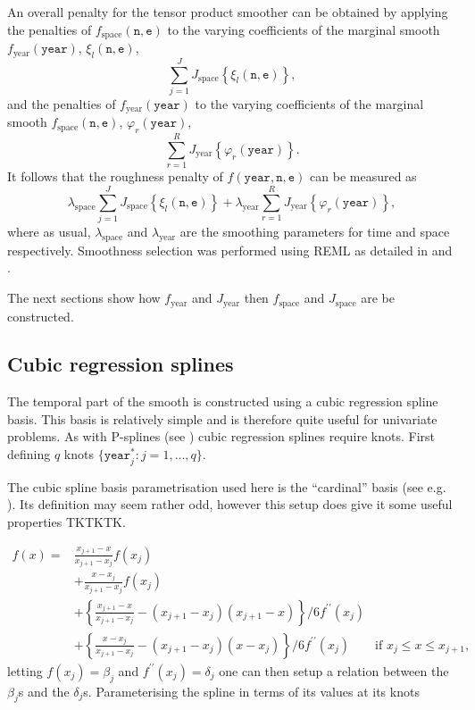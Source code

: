 An overall penalty for the tensor product smoother can be obtained by applying the penalties of $f_\text{space}(\texttt{n},\texttt{e})$ to the varying coefficients of the marginal smooth $f_\text{year}(\texttt{year})$, $\xi_l(\texttt{n},\texttt{e})$,
$$
\sum_{j=1}^J J_\text{space}\left\{  \xi_l(\texttt{n},\texttt{e}) \right\},
$$ 
and the penalties of $f_\text{year}(\texttt{year})$ to the varying coefficients of the marginal smooth $f_\text{space}(\texttt{n},\texttt{e})$, $\varphi_r(\texttt{year})$,  
$$
\sum_{r=1}^R J_\text{year}\left\{  \varphi_r(\texttt{year}) \right\}.
$$ 
It follows that the roughness penalty of $f(\texttt{year},\texttt{n},\texttt{e})$ can be measured as 
\begin{equation}
\lambda_\text{space} \sum_{j=1}^J J_\text{space}\left\{  \xi_l(\texttt{n},\texttt{e}) \right\} + \lambda_\text{year} \sum_{r=1}^R J_\text{year}\left\{  \varphi_r(\texttt{year}) \right\},
\label{it-fullpen}
\end{equation}
where as usual, $\lambda_\text{space}$ and $\lambda_\text{year}$ are the smoothing parameters for time and space respectively. Smoothness selection was performed using REML as detailed in  and .

The next sections show how $f_\text{year}$ and $J_\text{year}$ then $f_\text{space}$ and $J_\text{space}$ are be constructed.

\subsection{Cubic regression splines}

The temporal part of the smooth is constructed using a cubic regression spline basis. This basis is relatively simple and is therefore quite useful for univariate problems. As with P-splines (see ) cubic regression splines require knots. First defining $q$ knots $\{\texttt{year}_j^* : j=1,\ldots,q\}$.

The cubic spline basis parametrisation used here is the ``cardinal'' basis (see e.g. \cite[pp. 149--150]{simonbook}). Its definition may seem rather odd, however this setup does give it some useful properties TKTKTK. 

\begin{align*}
f(x) =& \frac{x_{j+1} - x}{x_{j+1} - x_j} f(x_j)\\
& + \frac{x - x_j}{x_{j+1} - x_j} f(x_j)\\
& + \left\{ \frac{x_{j+1} - x}{x_{j+1} - x_j} - (x_{j+1} - x_j)(x_{j+1} - x)\right \}/6 f^{\prime\prime}(x_j)\\
& + \left\{ \frac{x - x_j}{x_{j+1} - x_j} - (x_{j+1} - x_j)(x - x_j)\right \}/6 f^{\prime\prime}(x_j) \qquad \text{if } x_j \leq x \leq x_{j+1},
\end{align*}
letting $f(x_j) = \beta_j$ and $f^{\prime\prime}(x_j) = \delta_j$ one can then setup a relation between the $\beta_j$s and the $\delta_j$s. Parameterising the spline in terms of its values at its knots

